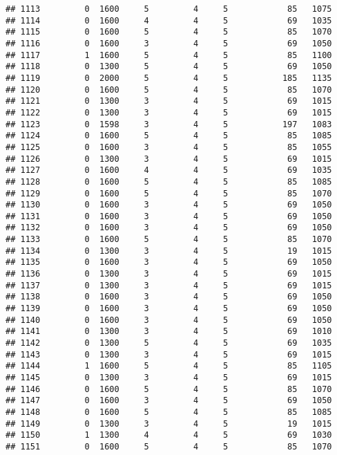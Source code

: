 \documentclass[]{article}
\begin{document}
\begin{verbatim}
## 1113         0  1600     5         4     5            85   1075
## 1114         0  1600     4         4     5            69   1035
## 1115         0  1600     5         4     5            85   1070
## 1116         0  1600     3         4     5            69   1050
## 1117         1  1600     5         4     5            85   1100
## 1118         0  1300     5         4     5            69   1050
## 1119         0  2000     5         4     5           185   1135
## 1120         0  1600     5         4     5            85   1070
## 1121         0  1300     3         4     5            69   1015
## 1122         0  1300     3         4     5            69   1015
## 1123         0  1598     3         4     5           197   1083
## 1124         0  1600     5         4     5            85   1085
## 1125         0  1600     3         4     5            85   1055
## 1126         0  1300     3         4     5            69   1015
## 1127         0  1600     4         4     5            69   1035
## 1128         0  1600     5         4     5            85   1085
## 1129         0  1600     5         4     5            85   1070
## 1130         0  1600     3         4     5            69   1050
## 1131         0  1600     3         4     5            69   1050
## 1132         0  1600     3         4     5            69   1050
## 1133         0  1600     5         4     5            85   1070
## 1134         0  1300     3         4     5            19   1015
## 1135         0  1600     3         4     5            69   1050
## 1136         0  1300     3         4     5            69   1015
## 1137         0  1300     3         4     5            69   1015
## 1138         0  1600     3         4     5            69   1050
## 1139         0  1600     3         4     5            69   1050
## 1140         0  1600     3         4     5            69   1050
## 1141         0  1300     3         4     5            69   1010
## 1142         0  1300     5         4     5            69   1035
## 1143         0  1300     3         4     5            69   1015
## 1144         1  1600     5         4     5            85   1105
## 1145         0  1300     3         4     5            69   1015
## 1146         0  1600     5         4     5            85   1070
## 1147         0  1600     3         4     5            69   1050
## 1148         0  1600     5         4     5            85   1085
## 1149         0  1300     3         4     5            19   1015
## 1150         1  1300     4         4     5            69   1030
## 1151         0  1600     5         4     5            85   1070

\end{verbatim}
\end{document}
